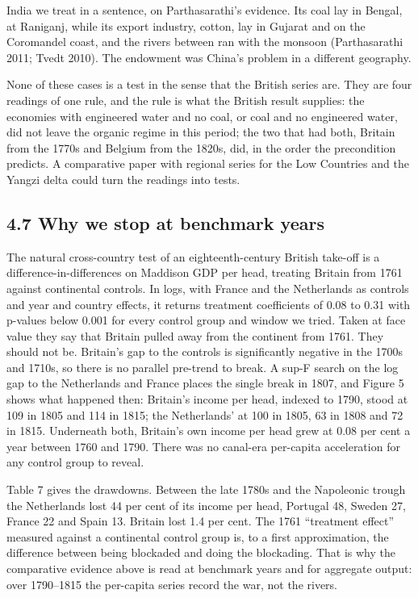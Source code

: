 \documentclass[
  11pt,
]{article}
\begin{document}
India we treat in a sentence, on Parthasarathi's evidence. Its coal lay
in Bengal, at Raniganj, while its export industry, cotton, lay in
Gujarat and on the Coromandel coast, and the rivers between ran with the
monsoon (Parthasarathi 2011; Tvedt 2010). The endowment was China's
problem in a different geography.

None of these cases is a test in the sense that the British series are.
They are four readings of one rule, and the rule is what the British
result supplies: the economies with engineered water and no coal, or
coal and no engineered water, did not leave the organic regime in this
period; the two that had both, Britain from the 1770s and Belgium from
the 1820s, did, in the order the precondition predicts. A comparative
paper with regional series for the Low Countries and the Yangzi delta
could turn the readings into tests.

\subsection{4.7 Why we stop at benchmark
years}\label{why-we-stop-at-benchmark-years}

The natural cross-country test of an eighteenth-century British take-off
is a difference-in-differences on Maddison GDP per head, treating
Britain from 1761 against continental controls. In logs, with France and
the Netherlands as controls and year and country effects, it returns
treatment coefficients of 0.08 to 0.31 with p-values below 0.001 for
every control group and window we tried. Taken at face value they say
that Britain pulled away from the continent from 1761. They should not
be. Britain's gap to the controls is significantly negative in the 1700s
and 1710s, so there is no parallel pre-trend to break. A sup-F search on
the log gap to the Netherlands and France places the single break in
1807, and Figure 5 shows what happened then: Britain's income per head,
indexed to 1790, stood at 109 in 1805 and 114 in 1815; the Netherlands'
at 100 in 1805, 63 in 1808 and 72 in 1815. Underneath both, Britain's
own income per head grew at 0.08 per cent a year between 1760 and 1790.
There was no canal-era per-capita acceleration for any control group to
reveal.

Table 7 gives the drawdowns. Between the late 1780s and the Napoleonic
trough the Netherlands lost 44 per cent of its income per head, Portugal
48, Sweden 27, France 22 and Spain 13. Britain lost 1.4 per cent. The
1761 ``treatment effect'' measured against a continental control group
is, to a first approximation, the difference between being blockaded and
doing the blockading. That is why the comparative evidence above is read
at benchmark years and for aggregate output: over 1790--1815 the
per-capita series record the war, not the rivers.
\end{document}
